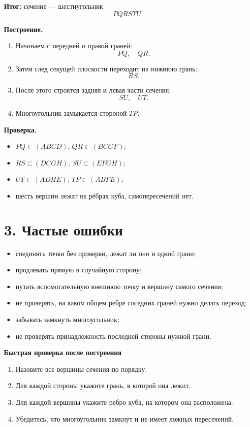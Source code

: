 \documentclass[a4paper,12pt]{article}
\begin{document}
\begin{minipage}[t]{0.43\linewidth}
\textbf{Итог:} сечение --- шестиугольник
\[
PQRSTU.
\]

\textbf{Построение.}
\begin{enumerate}
\item Начинаем с передней и правой граней:
\[
PQ,\quad QR.
\]
\item Затем след секущей плоскости переходит на нижнюю грань:
\[
RS.
\]
\item После этого строятся задняя и левая части сечения:
\[
SU,\quad UT.
\]
\item Многоугольник замыкается стороной $TP$.
\end{enumerate}

\textbf{Проверка.}
\begin{itemize}
\item $PQ\subset(ABCD)$, $QR\subset(BCGF)$;
\item $RS\subset(DCGH)$, $SU\subset(EFGH)$;
\item $UT\subset(ADHE)$, $TP\subset(ABFE)$;
\item шесть вершин лежат на рёбрах куба, самопересечений нет.
\end{itemize}
\end{minipage}


\clearpage
\section*{3. Частые ошибки}

\begin{itemize}
\item соединять точки без проверки, лежат ли они в одной грани;
\item продлевать прямую в случайную сторону;
\item путать вспомогательную внешнюю точку и вершину самого сечения;
\item не проверять, на каком общем ребре соседних граней нужно делать переход;
\item забывать замкнуть многоугольник;
\item не проверять принадлежность последней стороны нужной грани.
\end{itemize}

\textbf{Быстрая проверка после построения}

\begin{enumerate}
\item Назовите все вершины сечения по порядку.
\item Для каждой стороны укажите грань, в которой она лежит.
\item Для каждой вершины укажите ребро куба, на котором она расположена.
\item Убедитесь, что многоугольник замкнут и не имеет ложных пересечений.
\end{enumerate}
\end{document}

